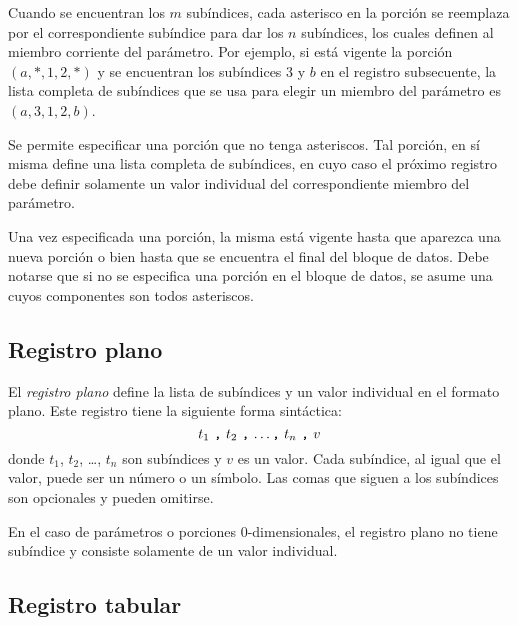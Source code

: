 \documentclass[11pt,spanish]{report}
\begin{document}
Cuando se encuentran los $m$ subíndices, cada asterisco en la porción se reemplaza por el correspondiente subíndice para dar los $n$ subíndices, los cuales definen al miembro corriente del parámetro. Por ejemplo, si está vigente la porción $(a,*,1,2,*)$ y se encuentran los subíndices 3 y $b$ en el registro subsecuente, la lista completa de subíndices que se usa para elegir un miembro del parámetro es $(a,3,1,2,b)$.

Se permite especificar una porción que no tenga asteriscos. Tal porción, en sí misma define una lista completa de subíndices, en cuyo caso el próximo registro debe definir solamente un valor individual del correspondiente miembro del parámetro.

Una vez especificada una porción, la misma está vigente hasta que aparezca una nueva porción o bien hasta que se encuentra el final del bloque de datos. Debe notarse que si no se especifica una porción en el bloque de datos, se asume una cuyos componentes son todos asteriscos.

\subsection{Registro plano}

El {\it registro plano} define la lista de subíndices y un valor individual en el formato plano. Este registro tiene la siguiente forma sintáctica:
$$\mbox{$t_1$ {\tt,} $t_2$ {\tt,} \dots {\tt,} $t_n$ {\tt,} $v$}$$
donde $t_1$, $t_2$, \dots, $t_n$ son subíndices y $v$ es un valor. Cada subíndice, al igual que el valor, puede ser un número o un símbolo. Las comas que siguen a los subíndices son opcionales y pueden omitirse.

En el caso de parámetros o porciones 0-dimensionales, el registro plano no tiene subíndice y consiste solamente de un valor individual.

\subsection{Registro tabular}
\end{document}
